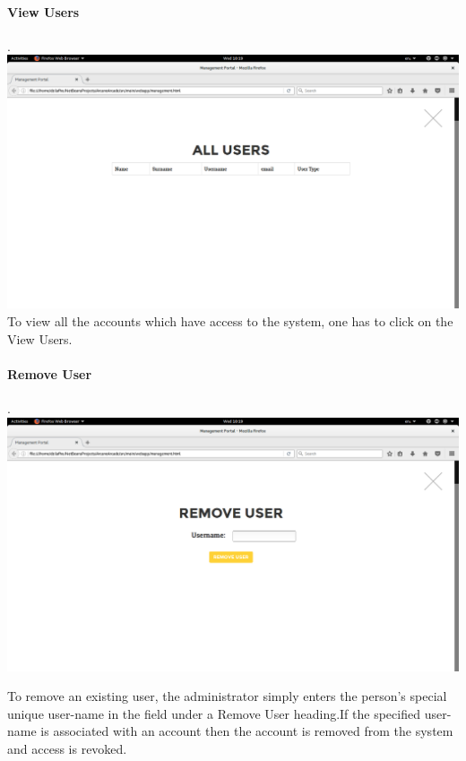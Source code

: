 \documentclass[english]{article}
\begin{document}
				\paragraph{View Users}. \\ \newline
				\includegraphics[width=\linewidth]{ViewUsers.png}				\newline
					To view all the accounts which have access to the system, one has to click on the View Users.\newline
				
				\paragraph{Remove User}. \\ \newline
				\includegraphics[width=\linewidth]{RemoveUser.png}				\newline

					To remove an existing user, the administrator simply enters the person's special unique user-name in the field under a Remove User heading.If the specified user-name is associated with an account then the account is removed from the system and access is revoked.
					\\[12pt]\newline
				
\end{document}
